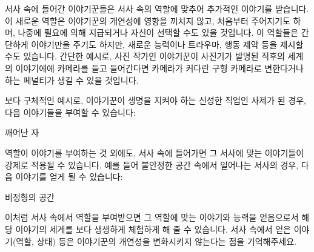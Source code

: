 \documentclass{report}
\begin{document}
	서사 속에 들어간 이야기꾼들은 서사 속의 역할에 맞추어 추가적인 이야기를 받습니다. 이 새로운 역할은 이야기꾼의 개연성에 영향을 끼치지 않고, 처음부터 주어지기도 하며, 나중에 필요에 의해 지급되거나 자신이 선택할 수도 있을 것입니다. 이 역할들은 간단하게 이야기만을 주기도 하지만, 새로운 능력이나 트라우마, 행동 제약 등을 제시할 수도 있습니다. 간단한 예시로, 사진 작가인 이야기꾼이 사진기가 발명된 직후의 세계의 이야기에에 카메라를 들고 들어간다면 카메라가 커다란 구형 카메라로 변한다거나 하는 페널티가 생길 수 있을 것입니다.
	
	\bigskip
	
	보다 구체적인 예시로, 이야기꾼이 생명을 지켜야 하는 신성한 직업인 사제가 된 경우, 다음 이야기들을 부여할 수 있습니다:
	
	\begin{lite}{깨어난 자}
		
	\end{lite}
	
	역할이 이야기를 부여하는 것 외에도, 서사 속에 들어가면 그 서사에 맞는 이야기들이 강제로 적용될 수 있습니다. 예를 들어 불안정한 공간 속에서 일어나는 서사의 경우, 다음 이야기를 얻게 될 수 있습니다:
	\begin{lite}{비정형의 공간}
	\end{lite}
	
	이처럼 서사 속에서 역할을 부여받으면 그 역할에 맞는 이야기와 능력을 얻음으로서 해당 이야기의 세계를 보다 생생하게 체험하게 해 줄 수 있습니다. 서사 속에서 얻은 이야기(역할, 상태) 등은 이야기꾼의 개연성을 변화시키지 않는다는 점을 기억해주세요.
\end{document}
